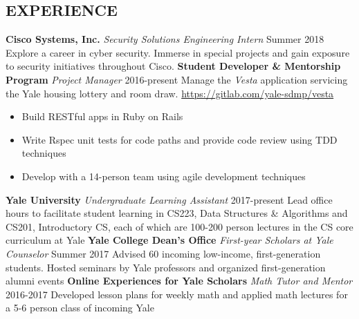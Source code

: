 \documentclass[margin, centered]{res}
\begin{document}
\begin{resume}
  \section{EXPERIENCE}
  \textbf{Cisco Systems, Inc.} \textit{Security Solutions Engineering Intern} \hfill 
  Summer 2018 \newline
  Explore a career in cyber security. Immerse in special projects and gain exposure to security
  initiatives throughout Cisco.\smallskip \newline 
  \textbf{Student Developer \&  Mentorship Program} \textit{Project Manager} \hfill 2016-present \newline
  Manage the \textit{Vesta} application servicing the Yale housing lottery and room draw. \newline 
  \href{https://gitlab.com/yale-sdmp/vesta}{https://gitlab.com/yale-sdmp/vesta}\smallskip{}
  \begin{itemize}
    \item Build RESTful apps in Ruby on Rails
    \item Write Rspec unit tests for code paths and provide code review using TDD techniques
    \item Develop with a 14-person team using agile development techniques
  \end{itemize}
  \textbf{Yale University} \textit{Undergraduate Learning Assistant} \hfill 2017-present \newline
  Lead office hours to facilitate student learning in CS223, Data Structures
  \& Algorithms and CS201, Introductory CS, each of which are 100-200 person lectures in the CS core curriculum at Yale \newline 
  \textbf{Yale College Dean's Office} \textit{First-year Scholars at Yale Counselor} \hfill Summer 2017 \newline
  Advised 60 incoming low-income, first-generation students. Hosted seminars by Yale professors and organized first-generation alumni events \newline
  \textbf{Online Experiences for Yale Scholars} \textit{Math Tutor and Mentor} \hfill 2016-2017 \newline
  Developed lesson plans for weekly math and applied math lectures for a 5-6 person class of incoming Yale 


\end{resume}
\end{document}
